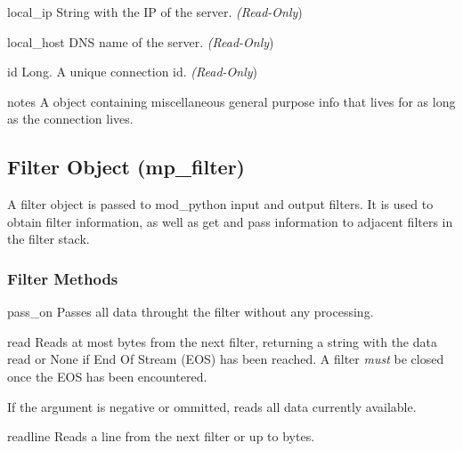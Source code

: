 \begin{memberdesc}[connection]{local_ip}
String with the IP of the server.
\emph{(Read-Only})
\end{memberdesc}

\begin{memberdesc}[connection]{local_host}
DNS name of the server.
\emph{(Read-Only})
\end{memberdesc}

\begin{memberdesc}[connection]{id}
Long. A unique connection id.
\emph{(Read-Only})
\end{memberdesc}

\begin{memberdesc}[connection]{notes}
A  object containing miscellaneous general purpose info that lives for
as long as the connection lives. 
\end{memberdesc}

\subsection{Filter Object (mp_filter)\label{pyapi-mpfilt}}

A filter object is passed to mod_python input and output filters. It
is used to obtain filter information, as well as get and pass
information to adjacent filters in the filter stack.

\subsubsection{Filter Methods\label{pyapi-mpfilt-meth}}

\begin{methoddesc}[filter]{pass_on}{}
Passes all data throught the filter without any processing.
\end{methoddesc}

\begin{methoddesc}[filter]{read}{}
Reads at most  bytes from the next filter, returning a string
with the data read or None if End Of Stream (EOS) has been reached. A
filter \emph{must} be closed once the EOS has been encountered.

If the  argument is negative or ommitted, reads all data
currently available.
\end{methoddesc}

\begin{methoddesc}[filter]{readline}{}
Reads a line from the next filter or up to  bytes.
\end{methoddesc}

